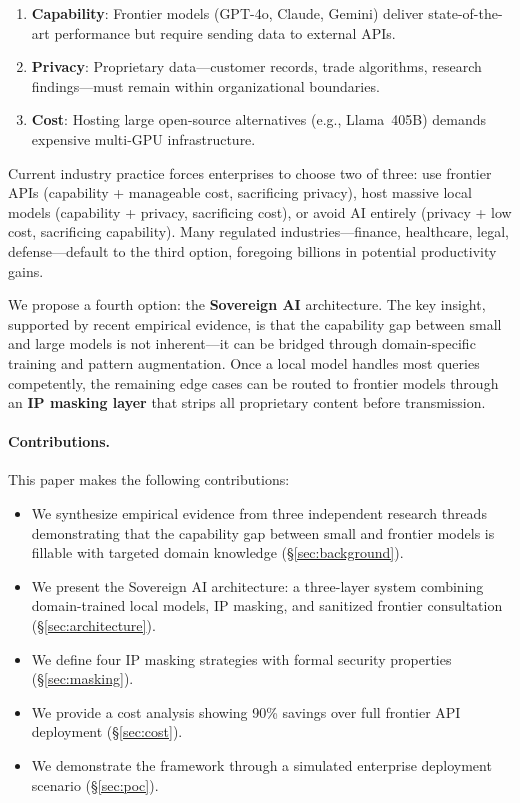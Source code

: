 \documentclass[11pt,a4paper]{article}
\begin{document}
\begin{enumerate}[leftmargin=2em]
    \item \textbf{Capability}: Frontier models (GPT-4o, Claude, Gemini) deliver state-of-the-art performance but require sending data to external APIs.
    \item \textbf{Privacy}: Proprietary data---customer records, trade algorithms, research findings---must remain within organizational boundaries.
    \item \textbf{Cost}: Hosting large open-source alternatives (e.g., Llama~405B) demands expensive multi-GPU infrastructure.
\end{enumerate}

Current industry practice forces enterprises to choose two of three: use frontier APIs (capability + manageable cost, sacrificing privacy), host massive local models (capability + privacy, sacrificing cost), or avoid AI entirely (privacy + low cost, sacrificing capability). Many regulated industries---finance, healthcare, legal, defense---default to the third option, foregoing billions in potential productivity gains.

We propose a fourth option: the \textbf{Sovereign AI} architecture. The key insight, supported by recent empirical evidence, is that the capability gap between small and large models is not inherent---it can be bridged through domain-specific training and pattern augmentation. Once a local model handles most queries competently, the remaining edge cases can be routed to frontier models through an \textbf{IP masking layer} that strips all proprietary content before transmission.

\paragraph{Contributions.} This paper makes the following contributions:
\begin{itemize}[leftmargin=2em]
    \item We synthesize empirical evidence from three independent research threads demonstrating that the capability gap between small and frontier models is fillable with targeted domain knowledge (\S\ref{sec:background}).
    \item We present the Sovereign AI architecture: a three-layer system combining domain-trained local models, IP masking, and sanitized frontier consultation (\S\ref{sec:architecture}).
    \item We define four IP masking strategies with formal security properties (\S\ref{sec:masking}).
    \item We provide a cost analysis showing 90\% savings over full frontier API deployment (\S\ref{sec:cost}).
    \item We demonstrate the framework through a simulated enterprise deployment scenario (\S\ref{sec:poc}).
\end{itemize}
\end{document}
